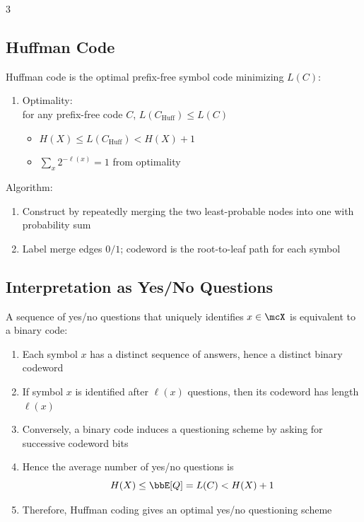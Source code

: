 \documentclass[12pt, a4paper]{article}
\begin{document}
\begin{multicols*}{3}
\subsection{Huffman Code}
Huffman code is the optimal prefix-free symbol code minimizing $L(C)$:
\begin{enumerate}[\roman*.]
  \item Optimality:\\for any prefix-free code $C$, $L(C_{\text{Huff}})\le L(C)$
    \begin{itemize}[leftmargin=*]\vspace{3pt}
      \item $H(X)\le L(C_{\text{Huff}}) < H(X)+1$
      \item $\sum_x 2^{-\ell(x)} = 1$ from optimality
    \end{itemize}
\end{enumerate}

Algorithm:
\begin{enumerate}[\roman*.]
  \item Construct by repeatedly merging the two least-probable nodes into one with probability sum
  \item Label merge edges $0/1$; codeword is the root-to-leaf path for each symbol
\end{enumerate}
\begin{center}
\end{center}

\colbreak 
\subsection{Interpretation as Yes/No Questions}
A sequence of yes/no questions that uniquely identifies $x\in\mcX$ is equivalent to a binary code:
\begin{enumerate}[\roman*.]
  \item Each symbol $x$ has a distinct sequence of answers, hence a distinct binary codeword
  \item If symbol $x$ is identified after $\ell(x)$ questions, then its codeword has length $\ell(x)$
  \item Conversely, a binary code induces a questioning scheme by asking for successive codeword bits
  \item Hence the average number of yes/no questions is
  \[
    H(X) \leq \E[Q] = L(C) < H(X) + 1
  \]
  \item Therefore, Huffman coding gives an optimal yes/no questioning scheme
\end{enumerate}


\end{multicols*}
\end{document}
